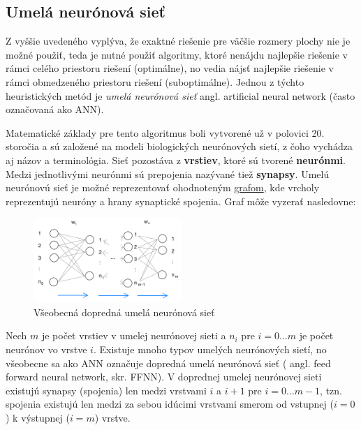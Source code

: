 \subsection{Umelá neurónová sieť}\label{subsec:algo-ann}

Z vyššie uvedeného vyplýva, že exaktné riešenie pre väčšie rozmery plochy nie je možné použiť, teda je nutné použiť
algoritmy, ktoré nenájdu najlepšie riešenie v rámci celého priestoru riešení (optimálne), no vedia nájsť
najlepšie riešenie v rámci obmedzeného priestoru riešení (suboptimálne).
Jednou z týchto heuristických metód je \emph{umelá neurónová sieť} angl. artificial neural network
(často označovaná ako ANN).

Matematické základy pre tento algoritmus boli vytvorené už v polovici 20. storočia a sú založené na modeli
biologických neurónových sietí, z čoho vychádza aj názov a terminológia.\cite{algo_ann_history}
Sieť pozostáva z \textbf{vrstiev}, ktoré sú tvorené \textbf{neurónmi}.
Medzi jednotlivými neurónmi sú prepojenia nazývané tiež \textbf{synapsy}.\cite{algo_ann_terminology}
Umelú neurónovú sieť je možné reprezentovať ohodnoteným \hyperref[figure:general-ann]{grafom}, kde vrcholy reprezentujú
neuróny a hrany synaptické spojenia.
Graf môže vyzerať nasledovne:
\begin{figure}[H]
    \centering
    \includegraphics[width=0.5\textwidth]{images/general-ann.jpg}
    \caption{Všeobecná dopredná umelá neurónová sieť}
\end{figure}\label{figure:general-ann}
Nech $m$ je počet vrstiev v umelej neurónovej sieti a $n_i$ pre $i = 0 \dots m$ je počet neurónov vo vrstve $i$.
Existuje mnoho typov umelých neurónových sietí, no všeobecne sa ako ANN označuje dopredná umelá neurónová sieť (
angl. feed forward neural network, skr. FFNN).
V doprednej umelej neurónovej sieti existujú synapsy (spojenia) len medzi vrstvami $i$ a $i + 1$ pre
$i = 0 \dots m - 1$, tzn. spojenia existujú len medzi za sebou idúcimi vrstvami smerom od vstupnej ($i=0$) k výstupnej
($i=m$) vrstve.

